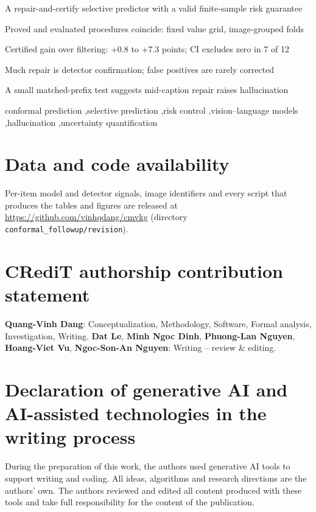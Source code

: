 \documentclass[review,number]{elsarticle}
\theoremstyle{plain}
\theoremstyle{definition}
\theoremstyle{remark}
\begin{document}
\begin{frontmatter}
\begin{highlights}
\item A repair-and-certify selective predictor with a valid finite-sample risk guarantee
\item Proved and evaluated procedures coincide: fixed value grid, image-grouped folds
\item Certified gain over filtering: +0.8 to +7.3 points; CI excludes zero in 7 of 12
\item Much repair is detector confirmation; false positives are rarely corrected
\item A small matched-prefix test suggests mid-caption repair raises hallucination
\end{highlights}

\begin{keyword}
conformal prediction \sep selective prediction \sep risk control \sep vision--language models \sep hallucination \sep uncertainty quantification
\end{keyword}
\end{frontmatter}











\section*{Data and code availability}
Per-item model and detector signals, image identifiers and every script that produces the tables and figures are
released at \url{https://github.com/vinhqdang/cmvkg} (directory \texttt{conformal\_followup/revision}).

\section*{CRediT authorship contribution statement}
\textbf{Quang-Vinh Dang}: Conceptualization, Methodology, Software, Formal analysis, Investigation, Writing.
\textbf{Dat Le}, \textbf{Minh Ngoc Dinh}, \textbf{Phuong-Lan Nguyen}, \textbf{Hoang-Viet Vu}, \textbf{Ngoc-Son-An Nguyen}: Writing -- review \& editing.

\section*{Declaration of generative AI and AI-assisted technologies in the writing process}
During the preparation of this work, the authors used generative AI tools to support writing and coding. All ideas, algorithms and research directions are the authors' own.
The authors reviewed and edited all content produced with these tools and take full responsibility for the content of the publication.
\end{document}
